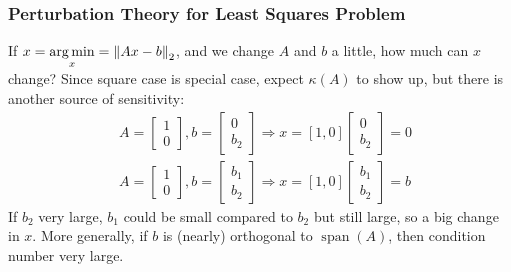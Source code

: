 \documentclass[11pt]{article}
\numberwithin{equation}{section}
\begin{document}
\subsubsection{Perturbation Theory for Least Squares Problem}
If $x=\underset{x}{\arg \min} = \left\| Ax-b \right\|_2$, and we change $A$ and $b$ a little, how much can $x$ change? 
Since square case is special case, expect $\kappa(A)$ to show up, but there is another source of sensitivity: \begin{align*}
    &A=\left[\begin{array}{l}
        1 \\
        0
        \end{array}\right], b=\left[\begin{array}{l}
        0 \\
        b_{2}
        \end{array}\right] \Rightarrow x= \left[ 1,0 \right] \left[\begin{array}{l}
        0 \\
        b_{2}
        \end{array}\right]=0 \\
    &A=\left[\begin{array}{l}
        1 \\
        0
        \end{array}\right], b=\left[\begin{array}{l}
        b_{1} \\
        b_{2}
        \end{array}\right] \Rightarrow x=\left[ 1,0 \right]\left[\begin{array}{l}
        b_{1} \\
        b_{2}
        \end{array}\right]=b
\end{align*}
If $b_2$ very large, $b_1$ could be small compared to $b_2$ but still large, so a big change in $x$. More generally, 
if $b$ is (nearly) orthogonal to $\operatorname{span}(A)$, then condition number very large.
\end{document}

